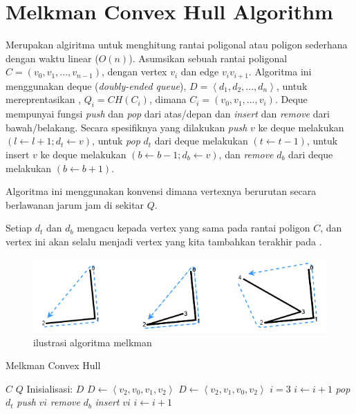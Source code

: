 \section{Melkman Convex Hull Algorithm}
Merupakan algiritma untuk menghitung rantai poligonal atau poligon sederhana dengan waktu linear ($O(n)$)\cite{melkman_algorithm}. Asumsikan sebuah rantai poligonal $C = (v_0, v_1, ..., v_{n-1})$, dengan vertex $v_i$ dan edge $v_i v_{i+1}$. Algoritma ini menggunakan deque (\textit{doubly-ended queue}), $D = \left \langle d_1, d_2, ..., d_n \right \rangle$, untuk mereprentasikan \CH, $Q_i = CH(C_i)$, dimana $C_i = (v_0, v_1, ..., v_i)$. Deque mempunyai fungsi \textit{push} dan \textit{pop} dari atas/depan dan \textit{insert} dan \textit{remove} dari bawah/belakang. Secara spesifiknya yang dilakukan \textit{push} $v$ ke deque melakukan $(l \leftarrow l+1; d_t \leftarrow v)$, untuk \textit{pop} $d_t$ dari deque melakukan $(t \leftarrow t-1)$, untuk insert $v$ ke deque melakukan $(b \leftarrow b-1; d_b \leftarrow v)$, dan \textit{remove} $d_b$ dari deque melakukan $(b \leftarrow b+1)$.
\par Algoritma ini menggunakan konvensi dimana vertexnya berurutan secara berlawanan jarum jam di sekitar \CH $Q$.
\par Setiap $d_t$ dan $d_b$ mengacu kepada vertex yang sama pada rantai poligon $C$, dan vertex ini akan selalu menjadi vertex yang kita tambahkan terakhir pada \CH.
\begin{figure}
	\Centering
	\includegraphics [width=\columnwidth]{bab2/img/ilustrasi-algoritma-melkman}
	\caption {ilustrasi algoritma melkman}
	\label {fig:ilustrasi-algoritma-melkman}
\end{figure}
\begin{algorithm}
	\caption{Melkman Convex Hull}
	\label{psdo:Melkman Convex Hull}
	\begin{algorithmic}[1]
		\Require $C$
		\Ensure $Q$
        \State Inisialisasi: $D$
            \State$D \leftarrow \left \langle v_2, v_0, v_1, v_2 \right \rangle$
        \Else
            \State $D \leftarrow \left \langle v_2, v_1, v_0, v_2 \right \rangle$
        \EndIf
        \State $i=3$
                \State $i \leftarrow i+1$
            \EndWhile
                \State \textit{pop} $d_t$
            \EndWhile
            \State \textit{push} $vi$
                \State \textit{remove} $d_b$
            \EndWhile
            \State \textit{insert} $vi$
            \State $i \leftarrow i+1$
        \EndWhile
	\end{algorithmic}
\end{algorithm}

